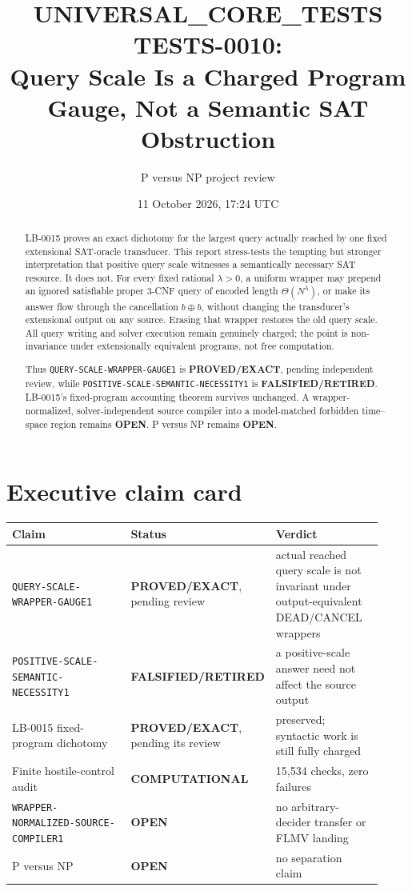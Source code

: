 \documentclass[11pt]{article}
\title{UNIVERSAL\_CORE\_TESTS TESTS-0010:\\
Query Scale Is a Charged Program Gauge, Not a Semantic SAT Obstruction}
\author{P versus NP project review}
\date{11 October 2026, 17:24 UTC}
\newcommand{\EXACT}{\textbf{PROVED/EXACT}}
\newcommand{\COMP}{\textbf{COMPUTATIONAL}}
\newcommand{\OPEN}{\textbf{OPEN}}
\newcommand{\RETIRED}{\textbf{FALSIFIED/RETIRED}}
\begin{document}
\maketitle

\begin{abstract}
LB-0015 proves an exact dichotomy for the largest query actually reached by
one fixed extensional SAT-oracle transducer.  This report stress-tests the
tempting but stronger interpretation that positive query scale witnesses a
semantically necessary SAT resource.  It does not.  For every fixed rational
$\lambda>0$, a uniform wrapper may prepend an ignored satisfiable proper
3-CNF query of encoded length $\Theta(N^\lambda)$, or make its answer flow
through the cancellation $b\oplus b$, without changing the transducer's
extensional output on any source.  Erasing that wrapper restores the old
query scale.  All query writing and solver execution remain genuinely
charged; the point is non-invariance under extensionally equivalent programs,
not free computation.

Thus \texttt{QUERY-SCALE-WRAPPER-GAUGE1} is \EXACT, pending independent
review, while \texttt{POSITIVE-SCALE-SEMANTIC-NECESSITY1} is \RETIRED.
LB-0015's fixed-program accounting theorem survives unchanged.  A
wrapper-normalized, solver-independent source compiler into a model-matched
forbidden time--space region remains \OPEN.  P versus NP remains \OPEN.
\end{abstract}

\section{Executive claim card}

\begin{center}\small
\begin{tabular}{@{}p{0.42\linewidth}p{0.19\linewidth}p{0.31\linewidth}@{}}
\toprule
Claim & Status & Verdict\\ \midrule
\texttt{QUERY-SCALE-WRAPPER-GAUGE1} & \EXACT, pending review & actual reached query scale is not invariant under output-equivalent DEAD/CANCEL wrappers\\
\texttt{POSITIVE-SCALE-SEMANTIC-NECESSITY1} & \RETIRED & a positive-scale answer need not affect the source output\\
LB-0015 fixed-program dichotomy & \EXACT, pending its review & preserved; syntactic work is still fully charged\\
Finite hostile-control audit & \COMP & 15,534 checks, zero failures\\
\texttt{WRAPPER-NORMALIZED-SOURCE-COMPILER1} & \OPEN & no arbitrary-decider transfer or FLMV landing\\
P versus NP & \OPEN & no separation claim\\
\bottomrule
\end{tabular}
\end{center}
\end{document}
